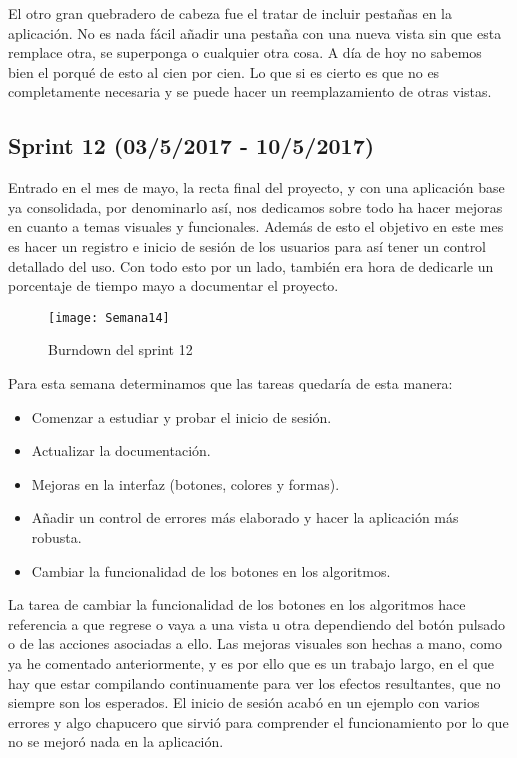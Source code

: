 El otro gran quebradero de cabeza fue el tratar de incluir pestañas en la aplicación. No es nada fácil añadir una pestaña con una nueva vista sin que esta remplace otra, se superponga o cualquier otra cosa. A día de hoy no sabemos bien el porqué de esto al cien por cien. Lo que si es cierto es que no es completamente necesaria y se puede hacer un reemplazamiento de otras vistas.

\subsection{Sprint 12 (03/5/2017 - 10/5/2017)}

Entrado en el mes de mayo, la recta final del proyecto, y con una aplicación base ya consolidada, por denominarlo así, nos dedicamos sobre todo ha hacer mejoras en cuanto a temas visuales y funcionales. Además de esto el objetivo en este mes es hacer un registro e inicio de sesión de los usuarios para así tener un control detallado del uso.
Con todo esto por un lado, también era hora de dedicarle un porcentaje de tiempo mayo a documentar el proyecto. 

\begin{figure}[h]
\centering
\texttt{[image: Semana14]}
\caption{Burndown del sprint 12}
\label{fig:A.11}
\end{figure}

Para esta semana determinamos que las tareas quedaría de esta manera:

\begin{itemize}
\item Comenzar a estudiar y probar el inicio de sesión.
\item Actualizar la documentación.
\item Mejoras en la interfaz (botones, colores y formas).
\item Añadir un control de errores más elaborado y hacer la aplicación más robusta.
\item Cambiar la funcionalidad de los botones en los algoritmos.
\end{itemize}

La tarea de cambiar la funcionalidad de los botones en los algoritmos hace referencia a que regrese o vaya a una vista u otra dependiendo del botón pulsado o de las acciones asociadas a ello.
Las mejoras visuales son hechas a mano, como ya he comentado anteriormente, y es por ello que es un trabajo largo, en el que hay que estar compilando continuamente para ver los efectos resultantes, que no siempre son los esperados.
El inicio de sesión acabó en un ejemplo con varios errores y algo chapucero que sirvió para comprender el funcionamiento por lo que no se mejoró nada en la aplicación.


